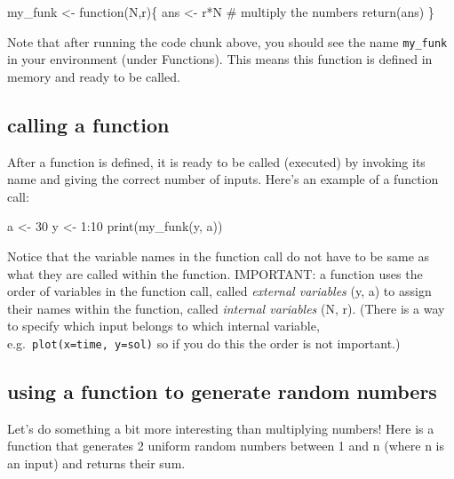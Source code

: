 \documentclass[
  letterpaper,
  DIV=11,
  numbers=noendperiod]{scrreprt}
\newenvironment{Shaded}{\begin{snugshade}}{\end{snugshade}}
\newcommand{\NormalTok}[1]{\textcolor[rgb]{0.00,0.23,0.31}{#1}}
\begin{document}
\begin{Shaded}
\begin{Highlighting}[]
\NormalTok{my\_funk \textless{}{-} function(N,r)\{ }
\NormalTok{  ans \textless{}{-} r*N \# multiply the numbers}
\NormalTok{  return(ans)}
\NormalTok{\}}
\end{Highlighting}
\end{Shaded}

Note that after running the code chunk above, you should see the name
\texttt{my\_funk} in your environment (under Functions). This means this
function is defined in memory and ready to be called.

\hypertarget{calling-a-function-1}{%
\subsection*{calling a function}\label{calling-a-function-1}}

After a function is defined, it is ready to be called (executed) by
invoking its name and giving the correct number of inputs. Here's an
example of a function call:

\begin{Shaded}
\begin{Highlighting}[]
\NormalTok{a \textless{}{-} 30}
\NormalTok{y \textless{}{-} 1:10}
\NormalTok{print(my\_funk(y, a))}
\end{Highlighting}
\end{Shaded}

Notice that the variable names in the function call do not have to be
same as what they are called within the function. IMPORTANT: a function
uses the order of variables in the function call, called \emph{external
variables} (y, a) to assign their names within the function, called
\emph{internal variables} (N, r). (There is a way to specify which input
belongs to which internal variable, e.g.~\texttt{plot(x=time,\ y=sol)}
so if you do this the order is not important.)

\hypertarget{using-a-function-to-generate-random-numbers}{%
\subsection*{using a function to generate random
numbers}\label{using-a-function-to-generate-random-numbers}}

Let's do something a bit more interesting than multiplying numbers! Here
is a function that generates 2 uniform random numbers between 1 and n
(where n is an input) and returns their sum.
\end{document}
